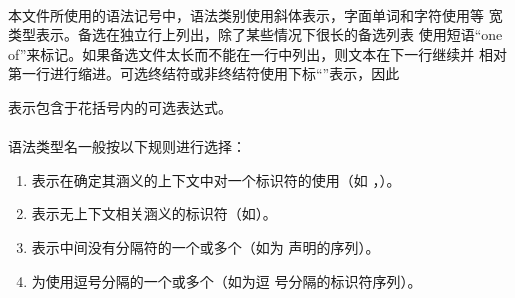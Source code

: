 \paragraph{} %
本文件所使用的语法记号中，语法类别使用斜体表示，字面单词和字符使用等
宽类型表示。备选在独立行上列出，除了某些情况下很长的备选列表
使用短语“one of”来标记。如果备选文件太长而不能在一行中列出，则文本在下一行继续并
相对第一行进行缩进。可选终结符或非终结符使用下标“”表示，因此
\par\hspace{-3.8em}
表示包含于花括号内的可选表达式。

\paragraph{} %
语法类型名一般按以下规则进行选择：
\begin{enumerate}
  \item {}表示在确定其涵义的上下文中对一个标识符的使用（如
        ，）。
  \item {}表示无上下文相关涵义的标识符（如）。
  \item {}表示中间没有分隔符的一个或多个（如为
        声明的序列）。
  \item {}为使用逗号分隔的一个或多个（如为逗
        号分隔的标识符序列）。
\end{enumerate}

